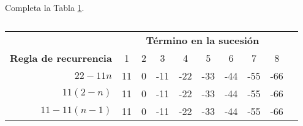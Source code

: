 Completa la Tabla \ref{tab:3.8}.

\begin{table}[H]
    \centering
    \caption{}
    \label{tab:3.8}
    \begin{tabular}{|r|*{9}{c|}}
        \toprule
        \rowcolor{colorrds!80}
                                                                                            & \multicolumn{8}{c|}{\bfseries\color{white}Término en la sucesión}                                         \\ \cline{2-9}
        \multirow{-2}{*}{\cellcolor{colorrds!80}\bfseries\color{white}Regla de recurrencia} & 1                                                                 & 2 & 3   & 4   & 5   & 6   & 7   & 8   \\ \hline
        $22-11n$                                                                            & 11                                                                & 0 & -11 & -22 & -33 & -44 & -55 & -66 \\ \hline
        $11\left(2-n\right)$                                                                & 11                                                                & 0 & -11 & -22 & -33 & -44 & -55 & -66 \\ \hline
        $11-11\left(n-1\right)$                                                             & 11                                                                & 0 & -11 & -22 & -33 & -44 & -55 & -66 \\ \cline{2-9}
        \bottomrule
    \end{tabular}
\end{table}
